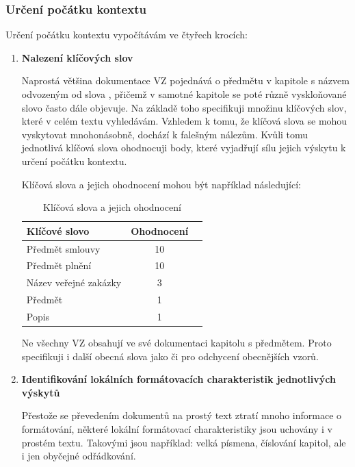 \documentclass[thesis=M,czech]{FITthesis}[2019/12/23]
\begin{document}
\subsubsection{Určení počátku kontextu}
Určení počátku kontextu vypočítávám ve čtyřech krocích:
\begin{enumerate}
    \item \textbf{Nalezení klíčových slov}
    
    Naprostá většina dokumentace VZ pojednává o předmětu v kapitole s názvem odvozeným od slova , přičemž v samotné kapitole se poté různě vyskloňované slovo často dále objevuje. Na základě toho specifikuji množinu klíčových slov, které v celém textu vyhledávám. Vzhledem k tomu, že klíčová slova se mohou vyskytovat mnohonásobně, dochází k falešným nálezům. Kvůli tomu jednotlivá klíčová slova ohodnocuji body, které vyjadřují sílu jejich výskytu k určení počátku kontextu.
    

    Klíčová slova a jejich ohodnocení mohou být například následující:
    \begin{table}[h!]
    \centering
    \begin{tabular}{ |l|c|c| }
     \hline
      Klíčové slovo & Ohodnocení \\\hline
      \hline
    Předmět smlouvy & 10\\
    Předmět plnění & 10\\
    Název veřejné zakázky & 3\\
    Předmět  & 1\\
    Popis & 1\\\hline
    \end{tabular}
    \caption{Klíčová slova a jejich ohodnocení}
    \label{table:example_subj_keywords}
    \end{table}

    Ne všechny VZ obsahují ve své dokumentaci kapitolu s předmětem. Proto specifikuji i další obecná slova jako  či  pro odchycení obecnějších vzorů.
    
    \item \textbf{Identifikování lokálních formátovacích charakteristik jednotlivých výskytů}
    
    Přestože se převedením dokumentů na prostý text ztratí mnoho informace o formátování, některé lokální formátovací charakteristiky jsou uchovány i v prostém textu. Takovými jsou například: velká písmena, číslování kapitol, ale i jen obyčejné odřádkování.
    

\end{enumerate}
\end{document}
